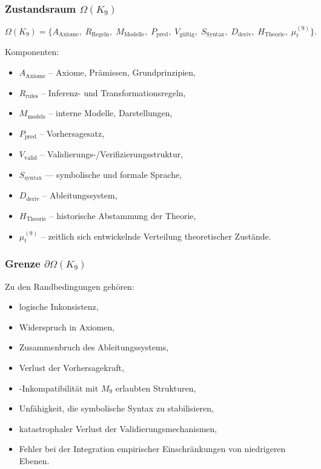 \subsubsection{Zustandsraum \texorpdfstring{$\Omega(K_9)$}{\Omega(K_9)}}

\[
\Omega(K_9)=
\{
A_{\mathrm{Axiome}},\;
R_{\mathrm{Regeln}},\;
M_{\mathrm{Modelle}},\;
P_{\mathrm{pred}},\;
V_{\mathrm{gültig}},\;
S_{\mathrm{Syntax}},\;
D_{\mathrm{deriv}},\;
H_{\mathrm{Theorie}},\;
\mu^{(9)}_t
\}.
\]

Komponenten:
\begin{itemize}
    \item $A_{\mathrm{Axiome}}$ – Axiome, Prämissen, Grundprinzipien,
    \item $R_{\mathrm{rules}}$ – Inferenz- und Transformationsregeln,
    \item $M_{\mathrm{models}}$ – interne Modelle, Darstellungen,
    \item $P_{\mathrm{pred}}$ – Vorhersagesatz,
    \item $V_{\mathrm{valid}}$ – Validierungs-/Verifizierungsstruktur,
    \item $S_{\mathrm{syntax}}$ — symbolische und formale Sprache,
    \item $D_{\mathrm{deriv}}$ – Ableitungssystem,
    \item $H_{\mathrm{Theorie}}$ – historische Abstammung der Theorie,
    \item $\mu^{(9)}_t$ – zeitlich sich entwickelnde Verteilung theoretischer Zustände.
\end{itemize}

\subsubsection{Grenze \texorpdfstring{$\partial\Omega(K_9)$}{\partial\Omega(K_9)}}

Zu den Randbedingungen gehören:
\begin{itemize}
    \item logische Inkonsistenz,
    \item Widerspruch in Axiomen,
    \item Zusammenbruch des Ableitungssystems,
    \item Verlust der Vorhersagekraft,
    \item-Inkompatibilität mit $M_9$ erlaubten Strukturen,
    \item Unfähigkeit, die symbolische Syntax zu stabilisieren,
    \item katastrophaler Verlust der Validierungsmechanismen,
    \item Fehler bei der Integration empirischer Einschränkungen von niedrigeren Ebenen.
\end{itemize}

